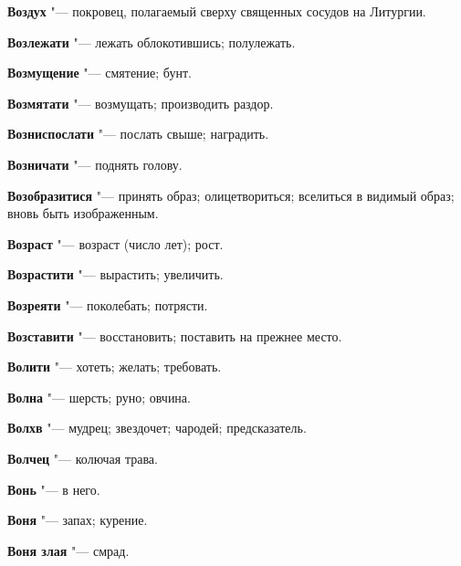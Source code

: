 \begin{mymulticols}{2}
\noindent\textbf{Воздух} "--- покровец, полагаемый сверху священных сосудов на Литургии. 




\noindent\textbf{Возлежати} "--- лежать облокотившись; полулежать. 




\noindent\textbf{Возмущение} "--- смятение; бунт. 




\noindent\textbf{Возмятати} "--- возмущать; производить раздор. 




\noindent\textbf{Возниспослати} "--- послать свыше; наградить. 




\noindent\textbf{Возничати} "--- поднять голову. 




\noindent\textbf{Возобразитися} "--- принять образ; олицетвориться; вселиться в видимый образ; вновь быть изображенным. 




\noindent\textbf{Возраст} "--- возраст (число лет); рост. 




\noindent\textbf{Возрастити} "--- вырастить; увеличить. 




\noindent\textbf{Возреяти} "--- поколебать; потрясти. 




\noindent\textbf{Возставити} "--- восстановить; поставить на прежнее место. 




\noindent\textbf{Волити} "--- хотеть; желать; требовать. 




\noindent\textbf{Волна} "--- шерсть; руно; овчина. 




\noindent\textbf{Волхв} "--- мудрец; звездочет; чародей; предсказатель. 




\noindent\textbf{Волчец} "--- колючая трава. 




\noindent\textbf{Вонь} "--- в него. 




\noindent\textbf{Воня} "--- запах; курение. 




\noindent\textbf{Воня злая} "--- смрад. 





\end{mymulticols}
